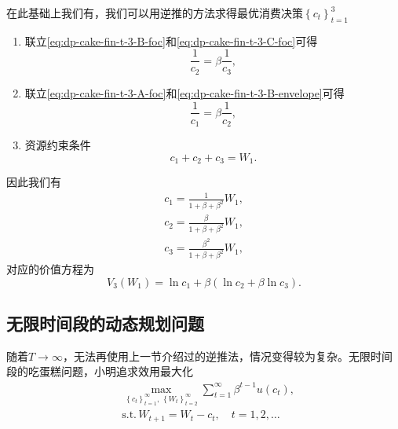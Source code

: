 在此基础上我们有，我们可以用逆推的方法求得最优消费决策$\left\{ c_{t} \right\}_{t=1}^{3}$
\begin{enumerate}
  \item 联立\eqref{eq:dp-cake-fin-t-3-B-foc}和\eqref{eq:dp-cake-fin-t-3-C-foc}可得
  \begin{equation*}
    \frac{1}{c_{2}} = \beta \frac{1}{c_{3}},
  \end{equation*}

  \item 联立\eqref{eq:dp-cake-fin-t-3-A-foc}和\eqref{eq:dp-cake-fin-t-3-B-envelope}可得
  \begin{equation*}
    \frac{1}{c_{1}} = \beta \frac{1}{c_{2}},
  \end{equation*}

  \item 资源约束条件
  \begin{equation*}
    c_{1} + c_{2} + c_{3} = W_{1}.
  \end{equation*}
\end{enumerate}

因此我们有
\begin{equation*}
  \begin{split}
    c_{1} = \frac{1}{1+\beta+\beta^{2}} W_{1}, \\
    c_{2} = \frac{\beta}{1+\beta+\beta^{2}} W_{1}, \\
    c_{3} = \frac{\beta^{2}}{1+\beta+\beta^{2}} W_{1},
  \end{split}
\end{equation*}
对应的价值方程为
\begin{equation}
  \label{eq:dp-cake-fin-t-3-value-function}
  V_{3} \left( W_{1} \right)
  = \ln c_{1} + \beta \left( \ln c_{2} + \beta \ln c_{3} \right).
\end{equation}


\subsection{无限时间段的动态规划问题}
\label{sec:dp-cake-infinite}
随着$T \rightarrow \infty$，无法再使用上一节介绍过的逆推法，情况变得较为复杂。无限时间段的吃蛋糕问题，小明追求效用最大化
\begin{equation*}
  \begin{split}
    & \max_{\left\{ c_{t} \right\}_{t=1}^{\infty}, \, \left\{ W_{t} \right\}_{t=2}^{\infty}}
    \sum_{t=1}^{\infty} \beta^{t-1} u \left( c_{t} \right), \\
    & \text{s.t.} \, W_{t+1} = W_{t} - c_{t}, \quad t = 1,2,\ldots
  \end{split}
\end{equation*}

